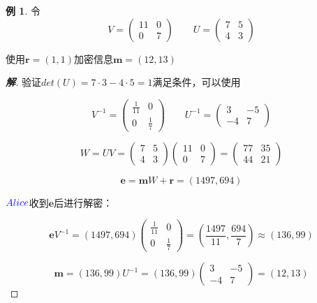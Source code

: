 \documentclass{article}
\theoremstyle{definition}
\newtheorem{example}{\indent 例}
\newenvironment{solution}{\begin{proof}[\indent\bf 解]}{\end{proof}}
\begin{document}
\begin{example}
令$$
V= \begin{pmatrix}
11 & 0 \\
0 & 7
\end{pmatrix}
 \quad\quad
U=\begin{pmatrix}
7 & 5 \\
4 & 3
\end{pmatrix}
$$

使用$\mathbf{r} = (1,1)$加密信息$\mathbf{m} = (12,13)$

\begin{solution}

验证$det(U) = 7 \cdot 3 - 4 \cdot 5 = 1$满足条件，可以使用

$$
V^{-1}=\begin{pmatrix}
\frac{1}{11} & 0 \\
0 & \frac{1}{7}
\end{pmatrix}
\quad\quad
U^{-1}=\begin{pmatrix}
3 & -5 \\
-4 & 7
\end{pmatrix}
$$

$$W = UV = \begin{pmatrix}
7 & 5 \\
4 & 3
\end{pmatrix}\begin{pmatrix}
11 & 0 \\
0 & 7
\end{pmatrix} = \begin{pmatrix}
77 & 35 \\
44 & 21
\end{pmatrix}  
$$

$$\mathbf{e} = \mathbf{m}W + \mathbf{r} = (1497       ,694)$$

${\color{blue}Alice}$收到$\mathbf{e}$后进行解密：

$$\mathbf{e} V^{-1} = (1497,694) \begin{pmatrix}
\frac{1}{11} & 0 \\
0 & \frac{1}{7}
\end{pmatrix} = \left(
\frac{1497}{11},  \frac{694}{7} \right) \approx (136,99)$$


$$ \mathbf{m} = (136,99)U^{-1} =  (136,99)\begin{pmatrix}
3 & -5 \\
-4 & 7
\end{pmatrix}= (12,13)$$



\end{solution}

\end{example}
\end{document}
